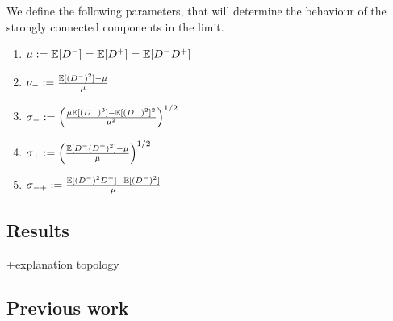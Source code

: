 We define the following parameters, that will determine the behaviour of the strongly connected components in the limit.
\begin{enumerate}
    \item $\mu:={\mathbb E}[D^-]={\mathbb E}[D^+]={\mathbb E}[D^-D^+]$
    \item $\nu_-:=\frac{{\mathbb E}[(D^-)^2]-\mu}{\mu}$ 
    \item $\sigma_-:=\left(\frac{\mu{\mathbb E}[(D^-)^3]-{\mathbb E}[(D^-)^2]^2}{\mu^2}\right)^{1/2}$ 
    \item $\sigma_+:=\left(\frac{{\mathbb E}[D^-(D^+)^2]-\mu}{\mu}\right)^{1/2}$ 
    \item $\sigma_{-+}:=\frac{{\mathbb E}[(D^-)^2D^+]-{\mathbb E}[(D^-)^2]}{\mu}$ 
\end{enumerate}
\subsection{Results}
+explanation topology
\subsection{Previous work}


